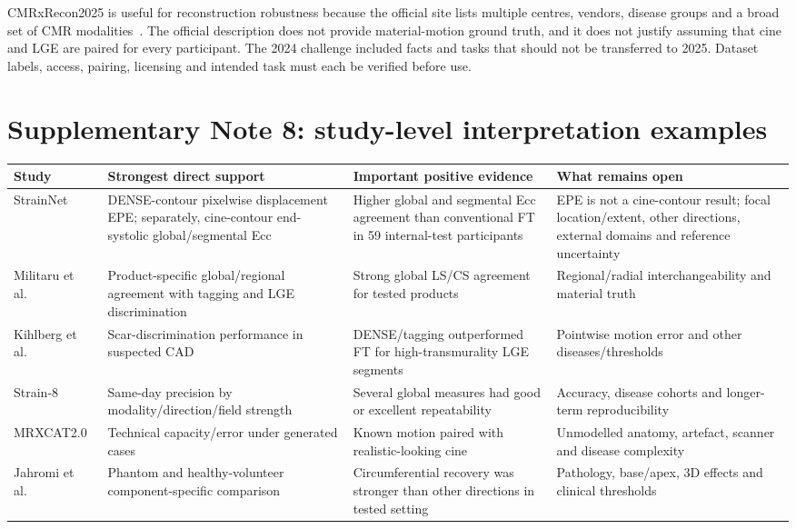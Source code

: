 \documentclass[11pt,a4paper]{article}
\begin{document}
CMRxRecon2025 is useful for reconstruction robustness because the official site lists multiple centres, vendors, disease groups and a broad set of CMR modalities~\cite{cmrxrecon2025official}. The official description does not provide material-motion ground truth, and it does not justify assuming that cine and LGE are paired for every participant. The 2024 challenge included facts and tasks that should not be transferred to 2025. Dataset labels, access, pairing, licensing and intended task must each be verified before use.

\section*{Supplementary Note 8: study-level interpretation examples}

{\small
\begin{longtable}{L{0.17\textwidth}L{0.21\textwidth}L{0.24\textwidth}L{0.25\textwidth}}
\toprule
Study & Strongest direct support & Important positive evidence & What remains open \\
\midrule
StrainNet~\cite{wang2023strainnet} & DENSE-contour pixelwise displacement EPE; separately, cine-contour end-systolic global/segmental Ecc & Higher global and segmental Ecc agreement than conventional FT in 59 internal-test participants & EPE is not a cine-contour result; focal location/extent, other directions, external domains and reference uncertainty \\
\addlinespace
Militaru et al.~\cite{militaru2021} & Product-specific global/regional agreement with tagging and LGE discrimination & Strong global LS/CS agreement for tested products & Regional/radial interchangeability and material truth \\
\addlinespace
Kihlberg et al.~\cite{kihlberg2020clinical} & Scar-discrimination performance in suspected CAD & DENSE/tagging outperformed FT for high-transmurality LGE segments & Pointwise motion error and other diseases/thresholds \\
\addlinespace
Strain-8~\cite{bell2025strain8} & Same-day precision by modality/direction/field strength & Several global measures had good or excellent repeatability & Accuracy, disease cohorts and longer-term reproducibility \\
\addlinespace
MRXCAT2.0~\cite{mrxcat2023} & Technical capacity/error under generated cases & Known motion paired with realistic-looking cine & Unmodelled anatomy, artefact, scanner and disease complexity \\
\addlinespace
Jahromi et al.~\cite{jahromi2026densecine} & Phantom and healthy-volunteer component-specific comparison & Circumferential recovery was stronger than other directions in tested setting & Pathology, base/apex, 3D effects and clinical thresholds \\
\bottomrule
\end{longtable}
}
\end{document}
